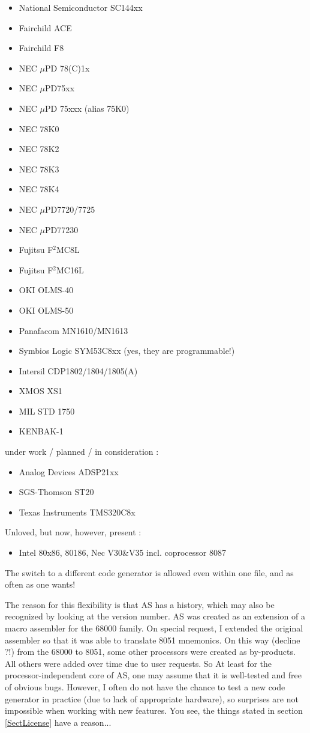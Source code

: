 \documentclass[12pt,twoside]{report}
\begin{document}
\begin{itemize}
\item{National Semiconductor SC144xx}
\item{Fairchild ACE}
\item{Fairchild F8}
\item{NEC $\mu$PD 78(C)1x}
\item{NEC $\mu$PD75xx}
\item{NEC $\mu$PD 75xxx (alias 75K0)}
\item{NEC 78K0}
\item{NEC 78K2}
\item{NEC 78K3}
\item{NEC 78K4}
\item{NEC $\mu$PD7720/7725}
\item{NEC $\mu$PD77230}
\item{Fujitsu F$^2$MC8L}
\item{Fujitsu F$^2$MC16L}
\item{OKI OLMS-40}
\item{OKI OLMS-50}
\item{Panafacom MN1610/MN1613}
\item{Symbios Logic SYM53C8xx (yes, they are programmable!)}
\item{Intersil CDP1802/1804/1805(A)}
\item{XMOS XS1}
\item{MIL STD 1750}
\item{KENBAK-1}
\end{itemize}
under work / planned / in consideration :
\begin{itemize}
\item{Analog Devices ADSP21xx}
\item{SGS-Thomson ST20}
\item{Texas Instruments TMS320C8x}
\end{itemize}
Unloved, but now, however, present :
\begin{itemize}
\item{Intel 80x86, 80186, Nec V30\&V35 incl. coprocessor 8087}
\end{itemize}
The switch to a different code generator is allowed even within one
file, and as often as one wants!

The reason for this flexibility is that AS has a history, which may also
be recognized by looking at the version number. AS was created as an
extension of a macro assembler for the 68000 family. On special request, I
extended the original assembler so that it was able to translate 8051
mnemonics.  On this way (decline ?!) from the 68000 to 8051, some other
processors were created as by-products.  All others were added over time
due to user requests.  So At least for the processor-independent core of
AS, one may assume that it is well-tested and free of obvious bugs.
However, I often do not have the chance to test a new code generator in
practice (due to lack of appropriate hardware), so surprises are not
impossible when working with new features.  You see, the things stated in
section \ref{SectLicense} have a reason...
\end{document}
